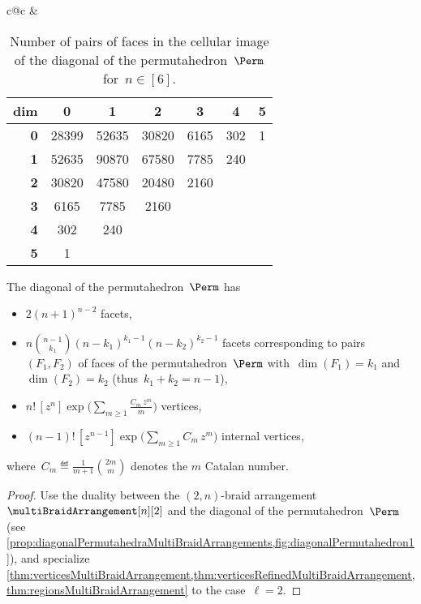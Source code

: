 {\begin{table}
{\begin{tabular}{c@{\quad}c}
			&
			\begin{tabular}[t]{r|cccccc}
				\textbf{dim} & \textbf{0} & \textbf{1} & \textbf{2} & \textbf{3} & \textbf{4} & \textbf{5} \\
				\hline
				\textbf{0} & 28399 & 52635 & 30820 & 6165 & 302 & 1 \\
				\textbf{1} & 52635 & 90870 & 67580 & 7785 & 240 & \\
				\textbf{2} & 30820 & 47580 & 20480 & 2160 & & \\
				\textbf{3} & 6165 & 7785 & 2160 & && \\
				\textbf{4} & 302 & 240 & & &&\\
				\textbf{5} & 1 & & & &&
			\end{tabular}
		\end{tabular}
	}
	\caption{Number of pairs of faces in the cellular image of the diagonal of the permutahedron~$\Perm$ for~$n \in [6]$.}
	\label{table:enumerationDiagonalPermutahedra2}
\end{table}
}

\begin{corollary}
\label{coro:enumerationDiagonalPermutahedra}
The diagonal of the permutahedron~$\Perm$ has 
\begin{itemize}
\item $2 (n + 1)^{n-2}$ facets,
\item $n \binom{n-1}{k_1} (n-k_1)^{k_1-1} (n-k_2)^{k_2-1}$ facets corresponding to pairs~$(F_1, F_2)$ of faces of the permutahedron~$\Perm$ with~$\dim(F_1) = k_1$ and~$\dim(F_2) = k_2$ (thus~$k_1 + k_2 = n-1$),
\item $\displaystyle n! \, [z^n] \exp \bigg( \sum_{m \ge 1} \frac{C_m \, z^m}{m} \bigg)$ vertices,
\item $\displaystyle (n-1)! \, [z^{n-1}] \exp \bigg( \sum_{m \ge 1} C_m \, z^m \bigg)$ internal vertices,
\end{itemize}
where~$\displaystyle C_m \eqdef \frac{1}{m+1} \binom{2m}{m}$ denotes the $m$\ordinal{} Catalan number.
\end{corollary}

\begin{proof}
Use the duality between the $(2,n)$-braid arrangement~$\multiBraidArrangement[n][2]$ and the diagonal of the permutahedron~$\Perm$ (see \cref{prop:diagonalPermutahedraMultiBraidArrangements,fig:diagonalPermutahedron1}), and specialize \cref{thm:verticesMultiBraidArrangement,thm:verticesRefinedMultiBraidArrangement,thm:regionsMultiBraidArrangement} to the case~$\ell = 2$.
\end{proof}

